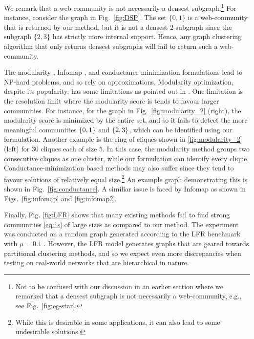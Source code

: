 We remark that a web-community is not necessarily a densest subgraph.\footnote{Not to be confused
	with our discussion in an earlier section where we remarked that a densest subgraph is not necessarily a web-community, e.g., see
	Fig.~\ref{fig:eg-star}.} 
For instance, consider the graph in Fig.~\ref{fig:DSP}.  The set $\{0,1\}$ is a web-community
that is returned by our method, but it is not a densest $2$-subgraph since the subgraph $\{2,3\}$
has strictly more internal support.  Hence, any graph clustering algorithm that only returns densest
subgraphs will fail to return such a web-community.


The modularity \cite{newman2006modularity}, Infomap \cite{rosvall2009map}, and conductance
minimization \cite{shi2000normalized} formulations lead to NP-hard problems, and so rely on
approximations.
Modularity optimization, despite its popularity, has some limitations as pointed out in
\cite{fortunato2007resolution}. One limitation is the resolution limit where the modularity score is tends to favour larger
communities. 
For instance, for the graph in Fig.~\ref{fig:modularity_2} (right), the  modularity score is
minimized by the entire set, and so it fails to detect the more meaningful communities $\{0,1\}$
and $\{2,3\}$, which can be identified using our formulation.
Another example is  the ring of cliques \cite{fortunato2007resolution} shown in \ref{fig:modularity_2} (left) for 
$30$ cliques each of size $5$. In this case, the modularity method
groups two consecutive cliques as one cluster, while our formulation can identify every clique.
%
Conductance-minimization based methods may also suffer since they tend to favour solutions of
relatively equal size.\footnote{While this is desirable in some applications, it can also lead to some
undesirable solutions.} An example graph demonstrating this is shown in Fig.~\ref{fig:conductance}.
A similiar issue is faced by Infomap as shown in Figs.~\ref{fig:infomap} and \ref{fig:infomap2}.


Finally, Fig. \ref{fig:LFR} shows that many existing methods fail to find strong communities
\eqref{eq:`s} of large sizes as compared to our method.
The experiment was conducted on a random graph generated according to the LFR benchmark with $\mu = 0.1$
\cite{lancichinetti2009benchmarks}.
However, the LFR model generates graphs that are geared towards partitional clustering methods,
and so we expect even more discrepancies when testing on real-world networks that are hierarchical
in nature.






